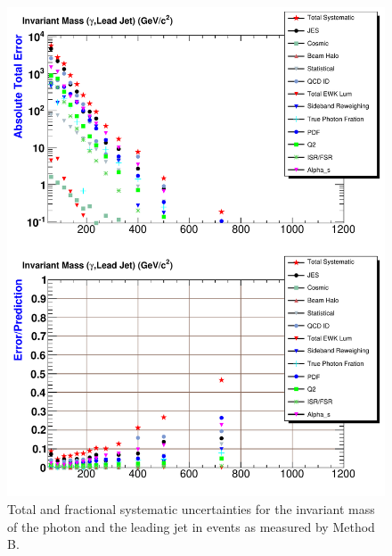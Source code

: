 \begin{figure}[p]
 \centering
 \includegraphics[scale=.7,keepaspectratio=true]{./G30Jets_Errs_MtdB_plot1_InvMass_pj1.pdf}
 \caption{Total and fractional systematic uncertainties for the invariant mass of the photon and the leading jet in \phoonejet events as measured by Method B.}
 \label{fig:g30Jets_Errs_MtdB_plot1_InvMass_pj1}
\end{figure}



